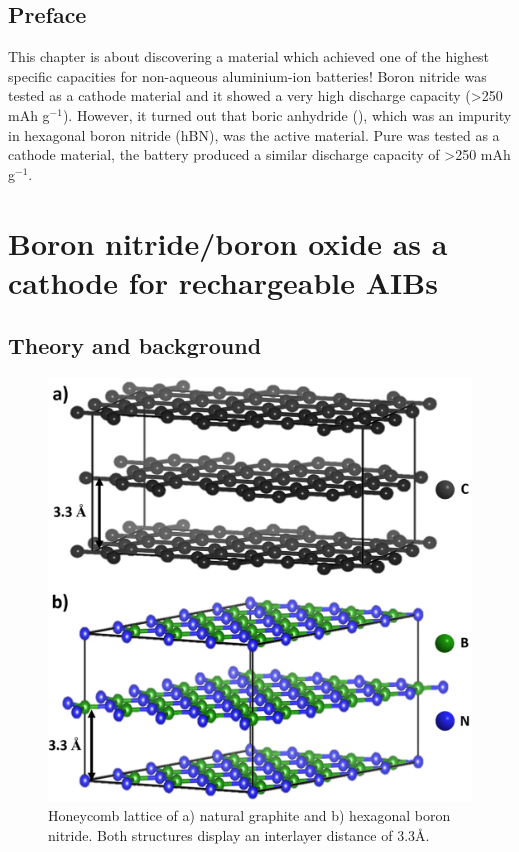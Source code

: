 \section*{Preface}
This chapter is about discovering a material which achieved one of the highest specific capacities for non-aqueous aluminium-ion batteries! Boron nitride was tested as a cathode material and it showed a very high discharge capacity (>250 mAh g$^{-1}$). However, it turned out that boric anhydride (), which was an impurity in hexagonal boron nitride (hBN), was the active material. Pure  was tested as a cathode material, the battery produced a similar discharge capacity of >250 mAh g$^{-1}$.   

\newpage
\chapter{Boron nitride/boron oxide as a cathode for rechargeable AIBs} 
\label{BOhBN} 

\section{Theory and background}

\begin{figure}[tbh!]
\centering
\includegraphics[width=\textwidth]{Figures/BOhBN/grpBNcomp}
\caption{Honeycomb lattice of a) natural graphite and b) hexagonal boron nitride. Both structures display an interlayer distance of 3.3\AA.}
\label{Figures/BOhBN:grpBNcomp}
\end{figure}

